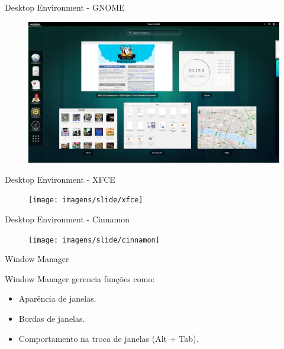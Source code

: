 \documentclass[size=14pt,
style=paintings
]{powerdot}
\newenvironment{vslide}{\vspace{\stretch{1}}}{\vspace{\stretch{1}}}
\begin{document}
\begin{slide}{Desktop Environment - GNOME}
  \centering
   \begin{figure}[!h]
  \includegraphics[scale=0.25]{imagens/slide/gnome}
   \end{figure}
\end{slide}

\begin{slide}{Desktop Environment - XFCE}
  \centering
   \begin{figure}[!h]
  \texttt{[image: imagens/slide/xfce]}
   \end{figure}
\end{slide}

\begin{slide}{Desktop Environment - Cinnamon}
  \centering
   \begin{figure}[!h]
  \texttt{[image: imagens/slide/cinnamon]}
   \end{figure}
\end{slide}

\begin{slide}{Window Manager}
\begin{vslide}

Window Manager gerencia funções como:

\begin{itemize}
\item Aparência de janelas.
\item Bordas de janelas.
\item Comportamento na troca de janelas (Alt + Tab).
\end{itemize}

\end{vslide}
\end{slide}
\end{document}
